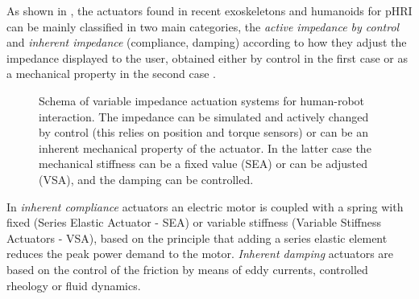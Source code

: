 
%


As shown in  , the actuators found in recent exoskeletons and humanoids for pHRI  can be mainly classified in two main categories, the {\em active impedance by control} and {\em inherent impedance }  (compliance, damping) according to how they adjust the impedance displayed to the user, obtained  either by control in the first case or as a mechanical property in the second case 
\cite{vanderborght2013variable}. %


\begin{figure}[]
	\centering
	\def\svgwidth{1\columnwidth}
	\begin{footnotesize}
		
	\end{footnotesize}
	\caption{Schema of variable impedance actuation systems for human-robot interaction. The impedance can be simulated and  actively changed by control (this relies on position and torque sensors) or can be an inherent mechanical property of the actuator. In the latter case the mechanical stiffness can be a fixed value (SEA) or can be adjusted (VSA), and the damping can be controlled.}
	\label{fig:exosActuators}
\end{figure}
%
\par In {\em  inherent compliance } actuators an electric motor is coupled with a spring with fixed (Series Elastic Actuator - SEA) or variable stiffness (Variable Stiffness Actuators - VSA), based on the principle that  adding a series elastic element reduces the peak power demand to the motor. {\em Inherent damping } actuators are based on the control of the friction by means of eddy currents, controlled rheology or fluid dynamics. 
% 

